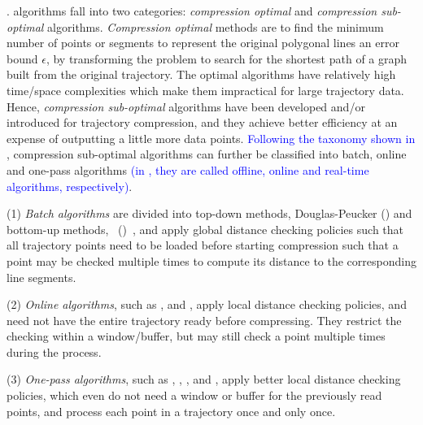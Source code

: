 . \lsa algorithms fall into two categories: \textit{compression optimal} and \textit{compression sub-optimal} algorithms.
\textit{Compression optimal} methods \cite{Imai:Optimal,Chan:Optimal} are to find the minimum number of points or segments to represent the original polygonal lines \wrt an error bound $\epsilon$, by transforming the problem to search for the shortest path of a graph built from the original trajectory.
The optimal \lsa algorithms have relatively high time/space complexities which make them impractical for large trajectory data.
Hence, \textit{compression sub-optimal} algorithms have been developed and/or introduced for trajectory compression, and they achieve better efficiency at an expense of outputting a little more data points. \textcolor{blue}{Following the taxonomy shown in \cite{Lange:Tracking, Lin:Operb, Lin:Cised}}, compression sub-optimal algorithms can further be classified into batch, online and one-pass algorithms \textcolor{blue}{(in \cite{Lange:Tracking}, they are called offline, online and real-time algorithms, respectively)}.

\sstab (1) {\em Batch algorithms} are divided into top-down methods, \eg Douglas-Peucker (\dpa) \cite{Douglas:Peucker,Meratnia:Spatiotemporal} and bottom-up methods, \eg\ \pavlidis (\tpa)~\cite{Pavlidis:Segment}, and apply global distance checking policies such that all trajectory points need to be loaded before starting compression such that a point may be checked multiple times to compute its distance to the corresponding line segments.

\sstab (2) {\em Online algorithms}, such as \opwa \cite{Meratnia:Spatiotemporal}, \squishe \cite{Muckell:Compression} and \bqsa \cite{Liu:BQS}, apply local distance checking policies, and need not have the entire trajectory ready before compressing. They restrict the checking within a window/buffer, but may still check a point  multiple times during the process.

\sstab (3) {\em One-pass algorithms}, such as \operb\cite{Lin:Operb}, \siped \cite{Williams:Longest,Sklansky:Cone,Dunham:Cone, Zhao:Sleeve}, \cised \cite{Lin:Cised}, \intersec\cite{Long:Direction} and \interval \cite{Ke:Interval}, apply better local distance checking policies, which even do not need a window or buffer for the previously read points, and process each point in a trajectory once and only once.


